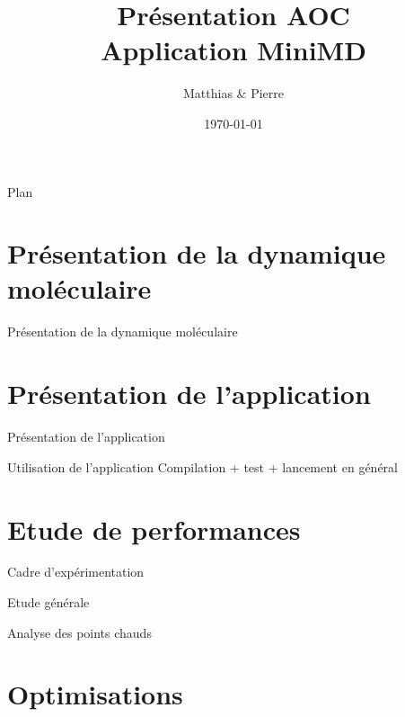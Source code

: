 \documentclass[9.5pt]{beamer}
\title[MPNA : MIS]{Présentation AOC \\Application MiniMD}
\author[\bsc{Beaupère} \& \bsc{Granger}]{Matthias \bsc{Beaupère} \& Pierre \bsc{Granger}}
\institute{M2 CHPS}
\date{\today}
\begin{document}

\begin{frame}
  \titlepage
\end{frame}

\begin{frame}{Plan}
	\tableofcontents[hideallsubsections]
\end{frame}

\section{Présentation de la dynamique moléculaire}
	\begin{frame}{Présentation de la dynamique moléculaire}
	\end{frame}

\section{Présentation de l'application}
	\begin{frame}{Présentation de l'application}
	\end{frame}

	\begin{frame}{Utilisation de l'application}
		Compilation + test + lancement en général
	\end{frame}

\section{Etude de performances}
	\begin{frame}{Cadre d'expérimentation}
		
	\end{frame}

	\begin{frame}{Etude générale}
		
	\end{frame}

	\begin{frame}{Analyse des points chauds}
		
	\end{frame}

\section{Optimisations}
\end{document}
